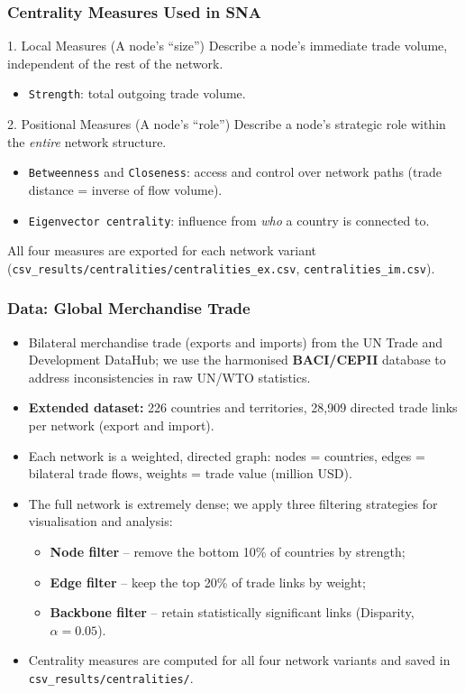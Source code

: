 \documentclass[aspectratio=169]{beamer}
\begin{document}
\begin{frame}
\frametitle{Centrality Measures Used in SNA}

{1. Local Measures (A node's ``size'')}
        Describe a node's immediate trade volume, independent of the rest of the network.
        
        \begin{itemize}
            \item \texttt{Strength}: total outgoing trade volume.
        \end{itemize}

{2. Positional Measures (A node's ``role'')}
        Describe a node's strategic role within the \emph{entire} network structure.
        
\begin{itemize}
    \item \texttt{Betweenness} and \texttt{Closeness}: access and control over network paths (trade distance = inverse of flow volume).
    \item \texttt{Eigenvector centrality}: influence from \emph{who} a country is connected to.
        \end{itemize}

\vspace{0.5em}
\small
All four measures are exported for each network variant (\texttt{csv\_results/centralities/centralities\_ex.csv}, \texttt{centralities\_im.csv}).

\end{frame}

\begin{frame}
    \frametitle{Data: Global Merchandise Trade}
     \begin{itemize}
     \item Bilateral merchandise trade (exports and imports) from the UN Trade and Development DataHub; we use the harmonised \textbf{BACI/CEPII} database \citep{Hoang2023} to address inconsistencies in raw UN/WTO statistics.
     \item \textbf{Extended dataset:} 226 countries and territories, 28{,}909 directed trade links per network (export and import).
     \item Each network is a weighted, directed graph: nodes = countries, edges = bilateral trade flows, weights = trade value (million USD).
     \item The full network is extremely dense; we apply three filtering strategies for visualisation and analysis:
        \begin{itemize}
            \item \textbf{Node filter} -- remove the bottom 10\% of countries by strength;
            \item \textbf{Edge filter} -- keep the top 20\% of trade links by weight;
            \item \textbf{Backbone filter} -- retain statistically significant links (Disparity, $\alpha = 0.05$).
        \end{itemize}
     \item Centrality measures are computed for all four network variants and saved in \texttt{csv\_results/centralities/}.
    \end{itemize}
\end{frame}
\end{document}
